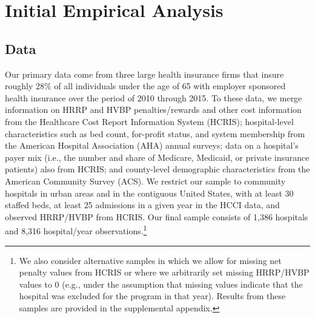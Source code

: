 \documentclass[12pt]{article}
\begin{document}
\section{Initial Empirical Analysis}
\label{sec:Empirical}

\subsection{Data}
Our primary data come from three large health insurance firms that insure roughly 28$\%$ of all individuals under the age of 65 with employer sponsored health insurance over the period of 2010 through 2015.  To these data, we merge information on HRRP and HVBP penalties/rewards and other cost information from the Healthcare Cost Report Information System (HCRIS); hospital-level characteristics such as bed count, for-profit status, and system membership from the American Hospital Association (AHA) annual surveys; data on a hospital's payer mix (i.e., the number and share of Medicare, Medicaid, or private insurance patients) also from HCRIS; and county-level demographic characteristics from the American Community Survey (ACS).  We restrict our sample to community hospitals in urban areas and in the contiguous United States, with at least 30 staffed beds, at least 25 admissions in a given year in the HCCI data, and observed HRRP/HVBP from HCRIS. Our final sample consists of 1,386 hospitals and 8,316 hospital/year observations.\footnote{We also consider alternative samples in which we allow for missing net penalty values from HCRIS or where we arbitrarily set missing HRRP/HVBP values to 0 (e.g., under the assumption that missing values indicate that the hospital was excluded for the program in that year). Results from these samples are provided in the supplemental appendix.}
\end{document}
